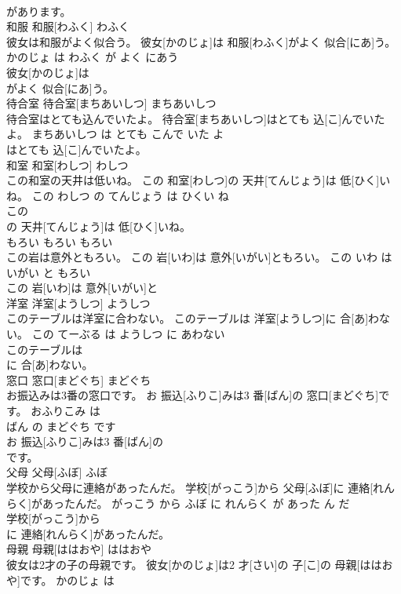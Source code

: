 \documentclass[8pt]{extreport}
\begin{document}
\begin{CJK}{UTF8}{min}
\\	があります。			
\\	和服	和服[わふく]	わふく	
\\	彼女は和服がよく似合う。	彼女[かのじょ]は 和服[わふく]がよく 似合[にあ]う。	かのじょ は わふく が よく にあう	
\\	彼女[かのじょ]は
\\	がよく 似合[にあ]う。			
\\	待合室	待合室[まちあいしつ]	まちあいしつ	
\\	待合室はとても込んでいたよ。	待合室[まちあいしつ]はとても 込[こ]んでいたよ。	まちあいしつ は とても こんで いた よ	
\\	はとても 込[こ]んでいたよ。			
\\	和室	和室[わしつ]	わしつ	
\\	この和室の天井は低いね。	この 和室[わしつ]の 天井[てんじょう]は 低[ひく]いね。	この わしつ の てんじょう は ひくい ね	
\\	この
\\	の 天井[てんじょう]は 低[ひく]いね。			
\\	もろい	もろい	もろい	
\\	この岩は意外ともろい。	この 岩[いわ]は 意外[いがい]ともろい。	この いわ は いがい と もろい	
\\	この 岩[いわ]は 意外[いがい]と
\\	洋室	洋室[ようしつ]	ようしつ	
\\	このテーブルは洋室に合わない。	このテーブルは 洋室[ようしつ]に 合[あ]わない。	この てーぶる は ようしつ に あわない	
\\	このテーブルは
\\	に 合[あ]わない。			
\\	窓口	窓口[まどぐち]	まどぐち	
\\	お振込みは3番の窓口です。	お 振込[ふりこ]みは3 番[ばん]の 窓口[まどぐち]です。	おふりこみ は 
\\	ばん の まどぐち です	
\\	お 振込[ふりこ]みは3 番[ばん]の
\\	です。			
\\	父母	父母[ふぼ]	ふぼ	
\\	学校から父母に連絡があったんだ。	学校[がっこう]から 父母[ふぼ]に 連絡[れんらく]があったんだ。	がっこう から ふぼ に れんらく が あった ん だ	
\\	学校[がっこう]から
\\	に 連絡[れんらく]があったんだ。			
\\	母親	母親[ははおや]	ははおや	
\\	彼女は2才の子の母親です。	彼女[かのじょ]は2 才[さい]の 子[こ]の 母親[ははおや]です。	かのじょ は 

\end{CJK}
\end{document}

